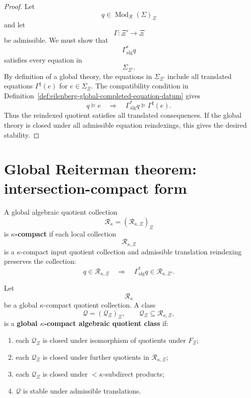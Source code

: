 \begin{proof}
Let
\[
q\in\operatorname{Mod}_{\mathcal R}(\Sigma)_\Xi
\]
and let
\[
\Gamma:\Xi'\to\Xi
\]
be admissible. We must show that
\[
\Gamma_{\mathrm{alg}}^\ast q
\]
satisfies every equation in
\[
\Sigma_{\Xi'}.
\]
By definition of a global theory, the equations in \(\Sigma_{\Xi'}\) include
all translated equations \(\Gamma^\sharp(e)\) for \(e\in\Sigma_\Xi\). The
compatibility condition in
Definition~\ref{def:eilenberg-global-completed-equation-datum} gives
\[
q\models e
\quad\Longrightarrow\quad
\Gamma_{\mathrm{alg}}^\ast q\models \Gamma^\sharp(e).
\]
Thus the reindexed quotient satisfies all translated consequences. If the
global theory is closed under all admissible equation reindexings, this gives
the desired stability.
\end{proof}

\section{Global Reiterman theorem: intersection-compact form}
\label{sec:eilenberg-global-reiterman-intersection-compact}

\begin{definition}
\label{def:eilenberg-global-kappa-compact-quotient-collection}
A global algebraic quotient collection
\[
\mathcal R_\kappa=(\mathcal R_{\kappa,\Xi})_\Xi
\]
is \textbf{\(\kappa\)-compact} if each local collection
\[
\mathcal R_{\kappa,\Xi}
\]
is a \(\kappa\)-compact input quotient collection and admissible translation
reindexing preserves the collection:
\[
q\in\mathcal R_{\kappa,\Xi}
\quad\Longrightarrow\quad
\Gamma_{\mathrm{alg}}^\ast q\in\mathcal R_{\kappa,\Xi'}.
\]
\end{definition}

\begin{definition}
\label{def:eilenberg-global-kappa-compact-algebraic-class}
Let
\[
\mathcal R_\kappa
\]
be a global \(\kappa\)-compact quotient collection. A class
\[
\mathcal Q=(\mathcal Q_\Xi)_\Xi,
\qquad
\mathcal Q_\Xi\subseteq\mathcal R_{\kappa,\Xi},
\]
is a \textbf{global \(\kappa\)-compact algebraic quotient class} if:
\begin{enumerate}
\item each \(\mathcal Q_\Xi\) is closed under isomorphism of quotients under
\(F_\Xi\);
\item each \(\mathcal Q_\Xi\) is closed under further quotients in
\(\mathcal R_{\kappa,\Xi}\);
\item each \(\mathcal Q_\Xi\) is closed under \(<\kappa\)-subdirect products;
\item \(\mathcal Q\) is stable under admissible translations.
\end{enumerate}
\end{definition}

